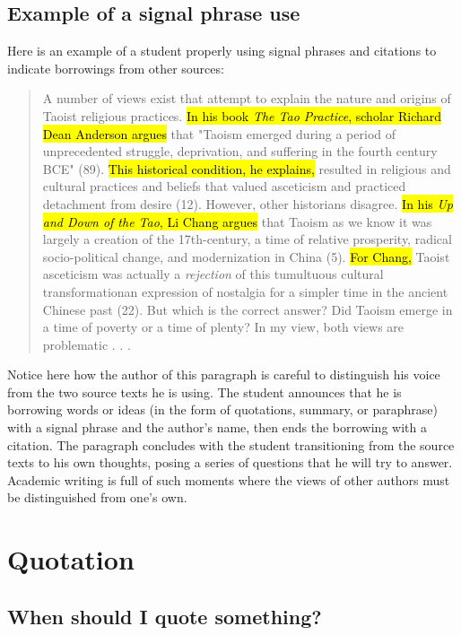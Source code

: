 \subsection{Example of a signal phrase use}

Here is an example of a student properly using signal phrases and citations to indicate borrowings from other sources:

\begin{quote}

A number of views exist that attempt to explain the nature and origins of Taoist religious practices. \hl{In his book \emph{The Tao Practice}, scholar Richard Dean Anderson argues} that "Taoism emerged during a period of unprecedented struggle, deprivation, and suffering in the fourth century BCE" (89). \hl{This historical condition, he explains,} resulted in religious and cultural practices and beliefs that valued asceticism and practiced detachment from desire (12). However, other historians disagree. \hl{In his \emph{Up and Down of the Tao}, Li Chang argues} that Taoism as we know it was largely a creation of the 17th-century, a time of relative prosperity, radical socio-political change, and modernization in China (5). \hl{For Chang,} Taoist asceticism was actually a \emph{rejection} of this tumultuous cultural transformation\textemdash an expression of nostalgia for a simpler time in the ancient Chinese past (22). But which is the correct answer? Did Taoism emerge in a time of poverty or a time of plenty? In my view, both views are problematic . . .

\end{quote}


\noindent Notice here how the author of this paragraph is careful to distinguish his voice from the two source texts he is using. The student announces that he is borrowing words or ideas (in the form of quotations, summary, or paraphrase) with a signal phrase and the author's name, then ends the borrowing with a citation. The paragraph concludes with the student transitioning from the source texts to his own thoughts, posing a series of questions that he will try to answer. Academic writing is full of such moments where the views of other authors must be distinguished from one's own. 


\hypertarget{quotation}{}
\section{Quotation}

\subsection{When should I quote something?}

